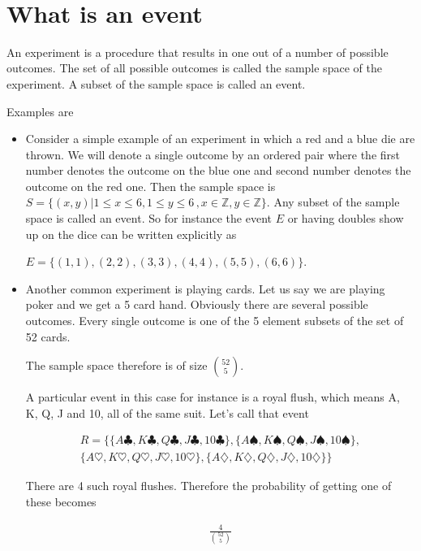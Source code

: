 \documentclass[12pt]{article}
\begin{document}
\begin{center}
\\
\vspace{1cm}
\end{center}


\medskip\noindent


\vspace{0.5cm}\noindent

\section*{What is an event}

An experiment is a procedure that results in one out of a number of possible outcomes. The set of all possible outcomes is called the sample space of the experiment. A subset of the sample space is called an event.

Examples are 

\begin{itemize}
\item Consider a simple example of an experiment in which a red and a blue die are thrown. We will denote a single outcome by an ordered pair where the first number denotes the outcome on the blue one and second number denotes the outcome on the red one.
Then the sample space is $S = \{(x,y)| 1 \le x \le 6, 1 \le y \le 6\, ,x \in \mathbb{Z}, y \in \mathbb{Z}\}$.
Any subset of the sample space is called an event. So for instance the event $E$ or having doubles show up on the dice can be written explicitly as

$E = \{(1,1), (2,2), (3,3), (4,4), (5,5), (6,6)\}$.

\item Another common experiment is playing cards. Let us say we are playing poker and we get a 5 card hand. Obviously there are several possible outcomes. Every single outcome is one of the 5 element subsets of the set of 52 cards. 

The sample space therefore is of size ${52 \choose 5}$.

A particular event in this case for instance is a royal flush, which means A, K, Q, J and 10, all of the same suit. Let's call that event 

\begin{multline*}
R = \{\{A \clubsuit, K \clubsuit, Q \clubsuit, J \clubsuit, 10 \clubsuit\} , \{A \spadesuit, K \spadesuit, Q \spadesuit, J \spadesuit, 10 \spadesuit \}, \\
\{A \heartsuit, K \heartsuit, Q \heartsuit, J \heartsuit, 10 \heartsuit \} , \{ A \diamondsuit, K \diamondsuit, Q \diamondsuit, J \diamondsuit , 10 \diamondsuit \} \}
\end{multline*} 

There are 4 such royal flushes. Therefore the probability of getting one of these becomes

\begin{align*}
\frac{4}{\binom{52}{5}}
\end{align*}

\end{itemize}
\end{document}
